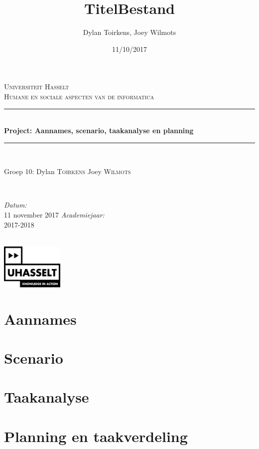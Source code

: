\documentclass[12pt]{article}
\author{Dylan Toirkens, Joey Wilmots}
\title{\textbf{TitelBestand}}
\date{11/10/2017}
\begin{document}
	\begin{titlepage}
		
		\newcommand{\HRule}{\rule{\linewidth}{0.5mm}} %
		
		\begin{center} %
			
			\textsc{\LARGE Universiteit Hasselt}\\[1.5cm] %
			\textsc{\Large Humane en sociale aspecten van de informatica}\\[0.5cm] %
			
			\HRule \\[0.4cm]
			{ \huge \bfseries Project: Aannames, scenario, taakanalyse en planning}\\[0.4cm]
			\HRule \\[1.5cm]
			
			\begin{minipage}{0.5\textwidth}
				\begin{flushleft} \large
					Groep 10:\newline
					Dylan \textsc{Toirkens}\newline
					Joey \textsc{Wilmots}
				\end{flushleft}
			\end{minipage}
			~
			\begin{minipage}{0.3\textwidth}
				\begin{flushright} \large
					\emph{Datum:}\\
					11 november 2017
					\emph{Academiejaar: } \\
					2017-2018
				\end{flushright}
			\end{minipage}\\[3cm]
			\vspace{25 mm}
			\includegraphics[width=3.0cm]{UHasselt-logo.jpg}\\[2.0cm]  
		\end{center}
	\end{titlepage}
\newpage
\tableofcontents
\section{Aannames}

\section{Scenario}

\section{Taakanalyse}

\section {Planning en taakverdeling}
\end{document}
